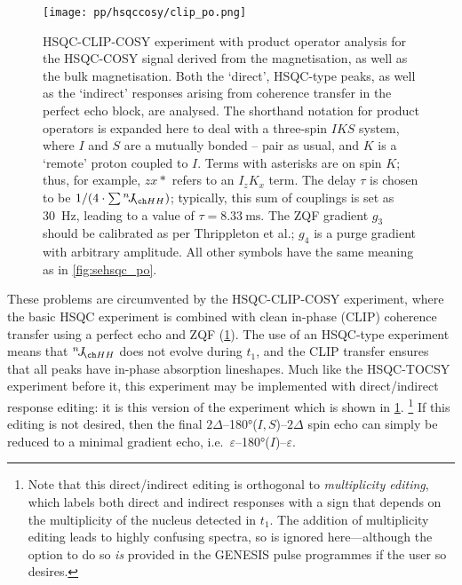 \begin{figure}[!ht]
    \centering
    \texttt{[image: pp/hsqccosy/clip\_po.png]}%
    \caption[HSQC-CLIP-COSY experiment]{
        HSQC-CLIP-COSY experiment with product operator analysis for the HSQC-COSY signal derived from the  magnetisation, as well as the bulk  magnetisation.
        Both the `direct', HSQC-type peaks, as well as the `indirect' responses arising from coherence transfer in the perfect echo block, are analysed.
        The shorthand notation for product operators is expanded here to deal with a three-spin $IKS$ system, where $I$ and $S$ are a mutually bonded \proton{}--\carbon{} pair as usual, and $K$ is a `remote' proton coupled to $I$.
        Terms with asterisks are on spin $K$; thus, for example, $zx*$ refers to an $I_zK_x$ term.
        The delay $\tau$ is chosen to be $1 / (4 \cdot \sum \nJ{HH})$; typically, this sum of couplings is set as \qty{30}{Hz}, leading to a value of $\tau = \qty{8.33}{\ms}$.
        The ZQF gradient $g_3$ should be calibrated as per Thrippleton et al.\autocite{Thrippleton2003ACIE}; $g_4$ is a purge gradient with arbitrary amplitude.
        All other symbols have the same meaning as in \cref{fig:sehsqc_po}.
    }
    \label{fig:hsqcc_clip_po}
\end{figure}

These problems are circumvented by the HSQC-CLIP-COSY experiment\autocite{Gyongyosi2018CPC,Gyongyosi2021AC}, where the basic HSQC experiment is combined with clean in-phase (CLIP) coherence transfer using a perfect echo\autocite{Aguilar2012CC,Parella2019MRC,Koos2016ACIE} and ZQF\autocite{Thrippleton2003ACIE} (\cref{fig:hsqcc_clip_po}).
The use of an HSQC-type experiment means that $\nJ{HH}$ does not evolve during $t_1$, and the CLIP transfer ensures that all peaks have in-phase absorption lineshapes.
Much like the HSQC-TOCSY experiment before it, this experiment may be implemented with direct/indirect response editing: it is this version of the experiment which is shown in \cref{fig:hsqcc_clip_po}.%
\footnote{Note that this direct/indirect editing is orthogonal to \textit{multiplicity editing}, which labels both direct and indirect responses with a sign that depends on the multiplicity of the \carbon{} nucleus detected in $t_1$. The addition of multiplicity editing leads to highly confusing spectra, so is ignored here---although the option to do so \textit{is} provided in the GENESIS pulse programmes if the user so desires.}
If this editing is not desired, then the final $2\Delta$--\ang{180}($I,S$)--$2\Delta$ spin echo can simply be reduced to a minimal gradient echo, i.e.\ $\varepsilon$--\ang{180}($I$)--$\varepsilon$.

